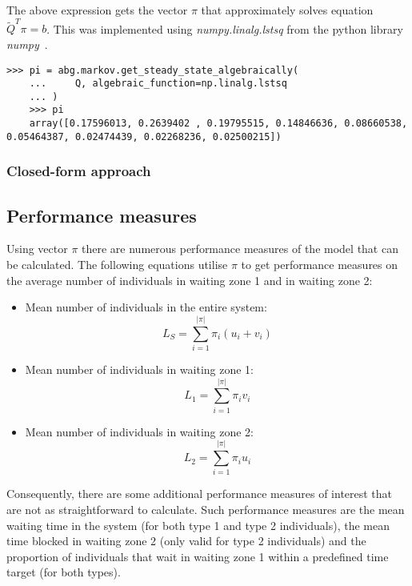 The above expression gets the vector \( \pi \) that approximately solves
equation \(\tilde Q^T \pi = b\).
This was implemented using \textit{numpy.linalg.lstsq} from the python
library \textit{numpy}~\cite{2020NumPy-Array}.

\begin{lstlisting}[style=pystyle]
    >>> pi = abg.markov.get_steady_state_algebraically(
    ...     Q, algebraic_function=np.linalg.lstsq
    ... )
    >>> pi
    array([0.17596013, 0.2639402 , 0.19795515, 0.14846636, 0.08660538, 0.05464387, 0.02474439, 0.02268236, 0.02500215])

\end{lstlisting}

\subsubsection{Closed-form approach}

\subsection{Performance measures}
Using vector \(\pi\) there are numerous performance measures of the model that
can be calculated.
The following equations utilise \(\pi\) to get performance measures on the
average number of individuals in waiting zone 1 and in waiting zone 2:

\begin{itemize}
    \item Mean number of individuals in the entire system:
        \begin{equation}
            L_S = \sum_{i=1}^{|\pi|} \pi_i (u_i + v_i)
        \end{equation}
    \item Mean number of individuals in waiting zone 1:
        \begin{equation}
            L_1 = \sum_{i=1}^{|\pi|} \pi_i v_i
        \end{equation}
    \item Mean number of individuals in waiting zone 2:
        \begin{equation}
            L_2 = \sum_{i=1}^{|\pi|} \pi_i u_i
        \end{equation}
\end{itemize}

Consequently, there are some additional performance measures of interest that
are not as straightforward to calculate.
Such performance measures are the mean waiting time in the system (for both
type 1 and type 2 individuals), the mean time blocked in waiting zone 2 (only
valid for type 2 individuals) and the proportion of individuals that wait in
waiting zone 1 within a predefined time target (for both types).

